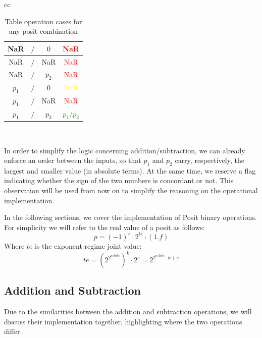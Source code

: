 \begin{table}
\begin{center}
\begin{tabular}{ cc }
\begin{tabular}{||c c c | c||}
    \hline
    NaR & $/$ & $0$ & \textcolor{red}{NaR} \\
    \hline
    NaR & $/$ & NaR & \textcolor{red}{NaR} \\
    \hline
    NaR & $/$ & $p_2$ & \textcolor{red}{NaR} \\ %
    \hline
    $p_1$ & $/$ & $0$ & \textcolor{yellow}{NaR} \\
    \hline
    $p_1$ & $/$ & NaR & \textcolor{red}{NaR} \\
    \hline
    $p_1$ & $/$ & $p_2$ & \textcolor{green}{$p_1 / p_2$} \\
    \hline
\end{tabular} \\
\end{tabular}
\end{center}
\caption{Table operation cases for any posit combination}
\label{table:table_posit_op_combination}
\end{table}







In order to simplify the logic concerning addition/subtraction, we can already enforce an order between the inputs, so that $p_1$ and $p_2$ carry, respectively, the largest and smaller value (in absolute terms). At the same time, we reserve a flag indicating whether the sign of the two numbers is concordant or not. This observation will be used from now on to simplify the reasoning on the operational implementation.




In the following sections, we cover the implementation of Posit binary operations. For simplicity we will refer to the real value of a posit as follows:
\begin{equation}\label{eqn:posit_equation}
    p = (-1)^{s} \cdot 2^{te} \cdot (1.f)
\end{equation}
Where $te$ is the exponent-regime joint value:
\begin{equation}
    te = (2^{2^{esbits}})^{k} \cdot 2^{e} = 2^{2^{esbits}\cdot k + e}
\end{equation}

\subsection{Addition and Subtraction}\label{Addition_and_Subtraction}

Due to the similarities between the addition and subtraction operations, we will discuss their implementation together, highlighting where the two operations differ.


